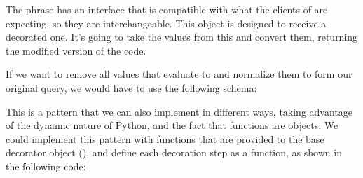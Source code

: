 \documentclass[a4paper,10pt,english]{sphinxmanual}
\begin{document}
The  phrase has an interface that is compatible with what the clients
of  are expecting, so they are interchangeable. This object is designed to receive
a decorated one. It’s going to take the values from this and convert them, returning the
modified version of the code.

If we want to remove all values that evaluate to  and normalize them to form our
original query, we would have to use the following schema:

\begin{sphinxVerbatim}[commandchars=\\\{\}]
      
  
\end{sphinxVerbatim}

This is a pattern that we can also implement in different ways, taking advantage of the
dynamic nature of Python, and the fact that functions are objects. We could implement this
pattern with functions that are provided to the base decorator object (),
and define each decoration step as a function, as shown in the following code:
\end{document}
